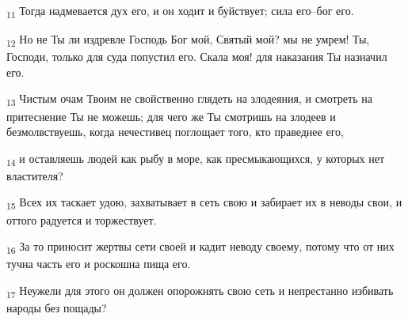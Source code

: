 \begin{tcolorbox}
\textsubscript{11} Тогда надмевается дух его, и он ходит и буйствует; сила его--бог его.
\end{tcolorbox}
\begin{tcolorbox}
\textsubscript{12} Но не Ты ли издревле Господь Бог мой, Святый мой? мы не умрем! Ты, Господи, только для суда попустил его. Скала моя! для наказания Ты назначил его.
\end{tcolorbox}
\begin{tcolorbox}
\textsubscript{13} Чистым очам Твоим не свойственно глядеть на злодеяния, и смотреть на притеснение Ты не можешь; для чего же Ты смотришь на злодеев и безмолвствуешь, когда нечестивец поглощает того, кто праведнее его,
\end{tcolorbox}
\begin{tcolorbox}
\textsubscript{14} и оставляешь людей как рыбу в море, как пресмыкающихся, у которых нет властителя?
\end{tcolorbox}
\begin{tcolorbox}
\textsubscript{15} Всех их таскает удою, захватывает в сеть свою и забирает их в неводы свои, и оттого радуется и торжествует.
\end{tcolorbox}
\begin{tcolorbox}
\textsubscript{16} За то приносит жертвы сети своей и кадит неводу своему, потому что от них тучна часть его и роскошна пища его.
\end{tcolorbox}
\begin{tcolorbox}
\textsubscript{17} Неужели для этого он должен опорожнять свою сеть и непрестанно избивать народы без пощады?
\end{tcolorbox}
